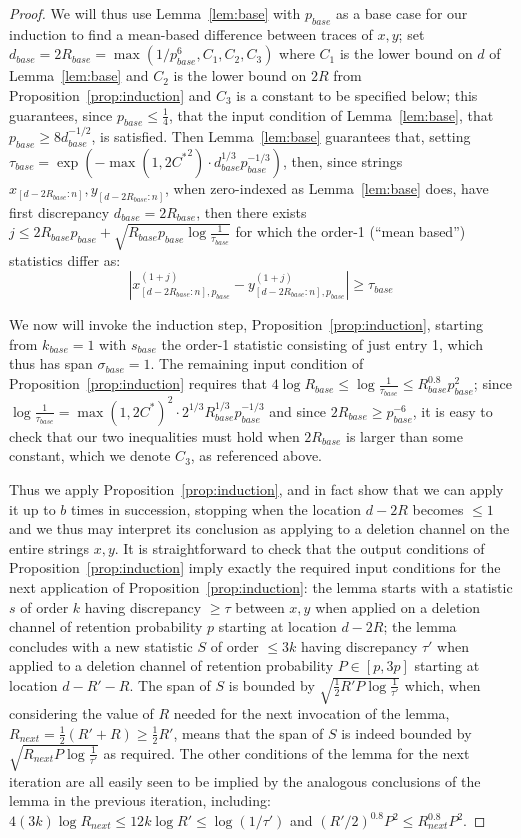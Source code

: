 \documentclass[11pt]{article}
\theoremstyle{plain}
\begin{document}
\begin{proof}
We will thus use Lemma~\ref{lem:base} with $p_{base}$ as a base case for our induction to find a mean-based difference between traces of $x,y$; set $d_{base}=2R_{base}=\max(1/p_{base}^6,C_1,C_2,C_3)$ where $C_1$ is the lower bound on $d$ of Lemma~\ref{lem:base} and $C_2$ is the lower bound on $2R$ from Proposition~\ref{prop:induction} and $C_3$ is a constant to be specified below; this guarantees, since $p_{base}\leq\frac{1}{4}$, that the input condition of Lemma~\ref{lem:base}, that $p_{base}\geq 8d_{base}^{-1/2}$, is satisfied. Then Lemma~\ref{lem:base} guarantees that, setting $\tau_{base}=\exp(-\max(1,2{C^*}^2) \cdot d_{base}^{1/3} p_{base}^{-1/3})$, then, since strings $x_{[d-2R_{base}:n]},y_{[d-2R_{base}:n]}$, when zero-indexed as Lemma~\ref{lem:base} does, have first discrepancy $d_{base}=2R_{base}$, then there exists $j\leq 2R_{base}p_{base}+\sqrt{R_{base}p_{base}\log\frac{1}{\tau_{base}}}$ for which the order-1 (``mean based'') statistics differ as: \[|x_{[d-2R_{base}:n],p_{base}}^{(1+j)}-y_{[d-2R_{base}:n],p_{base}}^{(1+j)}|\geq \tau_{base}\]



We now will invoke the induction step, Proposition~\ref{prop:induction}, starting from $k_{base}=1$ with $s_{base}$ the order-1 statistic consisting of just entry 1, which thus has span $\sigma_{base}=1$. The remaining input condition of Proposition~\ref{prop:induction} requires that $4 \log R_{base}\leq\log\frac{1}{\tau_{base}}\leq R_{base}^{0.8} p_{base}^2$; since $\log\frac{1}{\tau_{base}}=\max(1,2C^*)^2 \cdot 2^{1/3}R_{base}^{1/3} p_{base}^{-1/3}$ and since $2R_{base}\geq p_{base}^{-6}$, it is easy to check that our two inequalities must hold when $2R_{base}$ is larger than some constant, which we denote $C_3$, as referenced above.

Thus we apply Proposition~\ref{prop:induction}, and in fact show that we can apply it up to $b$ times in succession, stopping when the location $d-2R$ becomes $\leq 1$ and we thus may interpret its conclusion as applying to a deletion channel on the entire strings $x,y$. It is straightforward to check that the output conditions of Proposition~\ref{prop:induction} imply exactly the required input conditions for the next application of  Proposition~\ref{prop:induction}: the lemma starts with a statistic $s$ of order $k$ having discrepancy $\geq \tau$ between $x,y$ when applied on a deletion channel of retention probability $p$ starting at location $d-2R$; the lemma concludes with a new statistic $S$ of order $\leq 3k$ having discrepancy $\tau'$ when applied to a deletion channel of retention probability $P\in[p,3p]$ starting at location $d-R'-R$. The span of $S$ is bounded by $\sqrt{\frac{1}{2}R'P\log\frac{1}{\tau'}}$ which, when considering the value of $R$ needed for the next invocation of the lemma, $R_{next}=\frac{1}{2}(R'+R)\geq \frac{1}{2}R'$, means that the span of $S$ is indeed bounded by $\sqrt{R_{next}P\log\frac{1}{\tau'}}$ as required. The other conditions of the lemma for the next iteration are all easily seen to be implied by the analogous conclusions of the lemma in the previous iteration, including: $4(3k)\log R_{next} \le 12k\log R' \le \log(1/\tau')$ and $(R'/2)^{0.8}P^2 \le R_{next}^{0.8}P^2$.


\end{proof}
\end{document}
